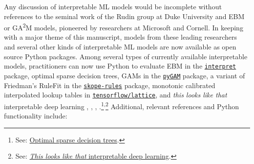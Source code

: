 \documentclass[information,article,submit,moreauthors,pdftex]{definitions/mdpi}
\begin{document}
Any discussion of interpretable ML models would be incomplete without references to the seminal work of the Rudin group at Duke University and EBM or GA\textsuperscript{2}M models, pioneered by researchers at Microsoft and Cornell. In keeping with a major theme of this manuscript, models from these leading researchers and several other kinds of interpretable ML models are now available as open source Python packages. Among several types of currently available interpretable models, practitioners can now use Python to evaluate EBM in the \href{https://github.com/interpretml/interpret}{\texttt{interpret}} package, optimal sparse decision trees, GAMs in the \href{https://github.com/dswah/pyGAM}{\texttt{pyGAM}} package, a variant of Friedman's RuleFit  in the \href{https://github.com/scikit-learn-contrib/skope-rules}{\texttt{skope-rules}} package, monotonic calibrated interpolated lookup tables in \href{https://github.com/tensorflow/lattice}{\texttt{tensorflow/lattice}}, and \textit{this looks like that} interpretable deep learning \cite{osdt}, \cite{rulefit}, \cite{lattice}, \cite{this_looks_like_that}.\footnote{See: \href{https://github.com/xiyanghu/OSDT}{Optimal sparse decision trees}.}\textsuperscript{,}\footnote{See: \href{https://github.com/cfchen-duke/ProtoPNet}{\textit{This looks like that} interpretable deep learning}.} Additional, relevant references and Python functionality include:
\end{document}
